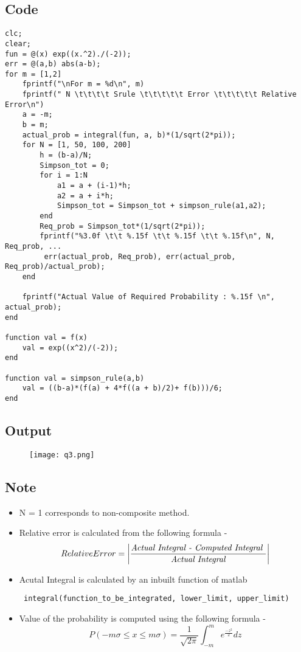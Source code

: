 \documentclass[12pt]{article}
\begin{document}
\subsection{Code}
\begin{verbatim}
clc;
clear;
fun = @(x) exp((x.^2)./(-2));
err = @(a,b) abs(a-b);
for m = [1,2]
    fprintf("\nFor m = %d\n", m)
    fprintf(" N \t\t\t\t Srule \t\t\t\t\t Error \t\t\t\t\t Relative Error\n")
    a = -m;
    b = m;
    actual_prob = integral(fun, a, b)*(1/sqrt(2*pi));
    for N = [1, 50, 100, 200]
        h = (b-a)/N;
        Simpson_tot = 0;
        for i = 1:N
            a1 = a + (i-1)*h;
            a2 = a + i*h;
            Simpson_tot = Simpson_tot + simpson_rule(a1,a2);
        end
        Req_prob = Simpson_tot*(1/sqrt(2*pi));
        fprintf("%3.0f \t\t %.15f \t\t %.15f \t\t %.15f\n", N, Req_prob, ...
         err(actual_prob, Req_prob), err(actual_prob, Req_prob)/actual_prob);
    end

    fprintf("Actual Value of Required Probability : %.15f \n", actual_prob);
end

function val = f(x)
    val = exp((x^2)/(-2));
end

function val = simpson_rule(a,b)
    val = ((b-a)*(f(a) + 4*f((a + b)/2)+ f(b)))/6;
end
\end{verbatim}

\subsection{Output}
\begin{figure}[H]
\centering
\texttt{[image: q3.png]}
\end{figure}

\subsection{Note}
\begin{itemize}
	\item N = 1 corresponds to non-composite method.
	\item Relative error is calculated from the following formula -
	$$ Relative Error = \left| \frac{\text{\textit{Actual Integral - Computed Integral} } }{\text{\textit{Actual Integral}}}\right| $$ 
	\item Acutal Integral is calculated by an inbuilt function of matlab \begin{verbatim} integral(function_to_be_integrated, lower_limit, upper_limit)
	\end{verbatim}
\item Value of the probability is computed using the following formula - 
$$ P(-m\sigma \leq x \leq m\sigma) = \frac{1}{\sqrt{2\pi}}\int_{-m}^m e^{\frac{-z^2}{2}} dz$$ 
\end{itemize}
\end{document}
